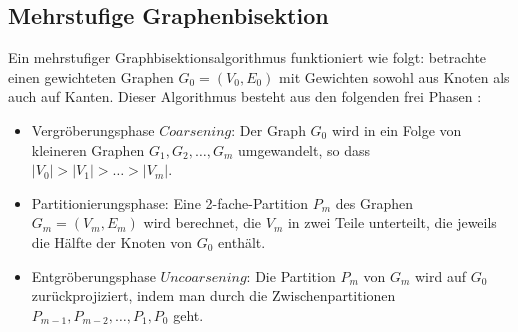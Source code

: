 \documentclass[runningheads]{llncs}
\begin{document}

\subsection{Mehrstufige Graphenbisektion}
Ein mehrstufiger Graphbisektionsalgorithmus funktioniert wie folgt: betrachte einen gewichteten Graphen $G_0 = (V_0, E_0)$ mit Gewichten sowohl aus Knoten als auch auf Kanten. Dieser Algorithmus besteht aus den folgenden frei Phasen \cite{karypis1998fast}:
\begin{itemize}
	\item Vergröberungsphase $Coarsening$: Der Graph $G_0$ wird in ein Folge von kleineren Graphen $G_1, G_2, \ldots, G_m$ umgewandelt, so dass $\lvert V_0 \lvert > \lvert V_1 \lvert > \ldots > \lvert V_m \lvert.$
	\item Partitionierungsphase: Eine 2-fache-Partition $P_m$ des Graphen $G_m = (V_m, E_m)$ wird berechnet, die $V_m$ in zwei Teile unterteilt, die jeweils die Hälfte der Knoten von $G_0$ enthält. 
	\item Entgröberungsphase $Uncoarsening$: Die Partition $P_m$ von $G_m$ wird auf $G_0$ zurückprojiziert, indem man durch die Zwischenpartitionen $P_{m-1}, P_{m-2}, \ldots, P_1, P_0$ geht.  
\end{itemize} 
\setcounter{secnumdepth}{3}
\end{document}
